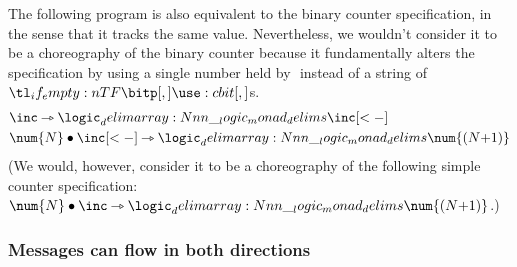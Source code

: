\begin{description}[font=\normalfont\itshape, leftmargin=\parindent, labelindent=\leftmargin]
The following program is also equivalent to the binary counter specification, in the sense that it tracks the same value.
Nevertheless, we wouldn't consider it to be a choreography of the binary counter because it fundamentally alters the specification by using a single number held by $\num{}$ instead of a string of $\bit{}$s.
\begin{align*}
  &\inc \lrimp \monad{\inc[<-]} \\
  &\num{N} \fuse \inc[<-] \lrimp \monad{\num{(N{+}1)}}
\end{align*}
(We would, however, consider it to be a choreography of the following simple counter specification: $\num{N} \fuse \inc \lrimp \monad{\num{(N{+}1)}}$.)
\end{description}




\subsubsection{Messages can flow in both directions}\label{sec:chor-binary-count}

